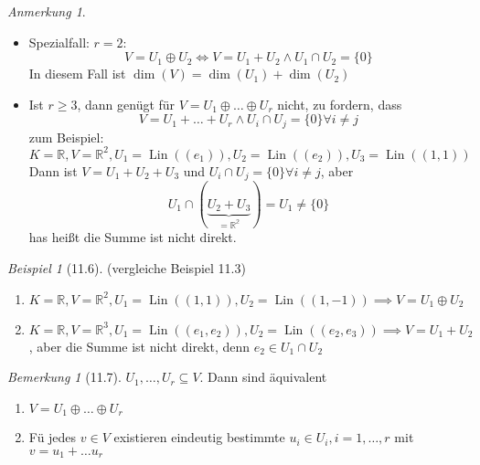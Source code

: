 \documentclass[a4paper]{scrartcl}
\DeclareMathOperator{\Forall}{\forall}
\DeclareMathOperator{\Lin}{Lin}
\theoremstyle{definition}
\theoremstyle{plain}
\theoremstyle{plain}
\theoremstyle{remark}
\newtheorem{remark}{Bemerkung}
\theoremstyle{remark}
\newtheorem{note}{Anmerkung}
\theoremstyle{remark}
\theoremstyle{remark}
\theoremstyle{remark}
\newtheorem{ex}{Beispiel}
\begin{document}
\begin{note}
\begin{itemize}
\item Spezialfall: $r = 2$:
\[V = U_1 \oplus U_2 \iff V = U_1 + U_2 \wedge U_1 \cap U_2 = \{0\}\]
In diesem Fall ist $\dim (V) = \dim (U_1) + \dim (U_2)$
\item Ist $r\geq 3$, dann genügt für $V = U_1 \oplus \ldots \oplus U_r$ nicht, zu fordern, dass
\[V = U_1 + \ldots + U_r \wedge U_i \cap U_j = \{0\} \Forall i\neq j\]
zum Beispiel:
\[K = \mathbb{R}, V = \mathbb{R}^2, U_1 = \Lin((e_1)), U_2 = \Lin((e_2)), U_3 = \Lin((1,1))\]
Dann ist $V = U_1 + U_2 + U_3$ und $U_i \cap U_j = \{0\} \Forall i\neq j$, aber
\[U_1 \cap (\underbrace{U_2 + U_3}_{= \mathbb{R^2}}) = U_1 \neq \{0\}\]
has heißt die Summe ist nicht direkt.
\end{itemize}
\end{note}
\begin{ex}[11.6]
(vergleiche Beispiel 11.3)
\begin{enumerate}
\item $K = \mathbb{R}, V = \mathbb{R}^2, U_1 = \Lin((1,1)), U_2 = \Lin((1, -1)) \implies V = U_1 \oplus U_2$
\item $K = \mathbb{R}, V = \mathbb{R}^3, U_1 = \Lin((e_1, e_2)), U_2 = \Lin((e_2, e_3)) \implies V = U_1 + U_2$, aber
die Summe ist nicht direkt, denn $e_2 \in U_1 \cap U_2$
\end{enumerate}
\end{ex}
\begin{remark}[11.7]
$U_1, \ldots, U_r \subseteq V$. Dann sind äquivalent
\begin{enumerate}
\item $V = U_1 \oplus \ldots \oplus U_r$
\item Fü jedes $v\in V$ existieren eindeutig bestimmte $u_i \in U_i, i = 1,\ldots, r$ mit $v = u_1 + \ldots u_r$
\end{enumerate}
\end{remark}
\end{document}
